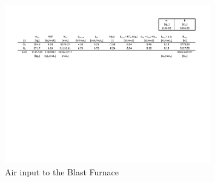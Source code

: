 \documentclass[energies,article,submit,pdftex,moreauthors]{Definitions/mdpi}
\begin{document}
\begin{figure}[h!]
  \centering
  \includegraphics[width=0.8\textwidth]{images/Air BF Inputs.pdf}
  \caption{Air input to the Blast Furnace}
  \label{fig:Air Blast Furnace Inputs}
\end{figure}
%
%
%
\end{document}
